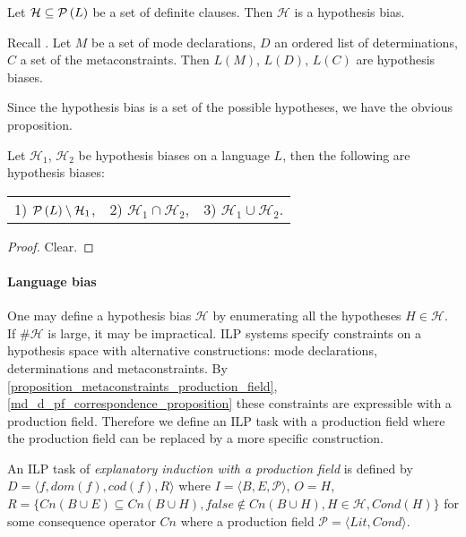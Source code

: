 \begin{exmp}
Let $\mathcal{H} \subseteq \mathcal{P} \left({ L }\right)$ be a set of definite clauses. Then $\mathcal{H}$ is a hypothesis bias.
\end{exmp}

\begin{exmp}
Recall .
Let $M$ be a set of mode declarations, $D$ an ordered list of determinations, $C$ a set of the metaconstraints.
Then $L(M)$, $L(D)$, $L(C)$ are hypothesis biases.
\end{exmp}

Since the hypothesis bias is a set of the possible hypotheses, we have the obvious proposition.
\begin{proposition}
Let $\mathcal{H}_1$, $\mathcal{H}_2$ be hypothesis biases on a language $L$, then the following are hypothesis biases:
\begin{tabular}{ c c c }
1) $\mathcal{P} \left({ L }\right) \setminus \mathcal{H}_1$,&
2) $\mathcal{H}_1 \cap \mathcal{H}_2$,&
3) $\mathcal{H}_1 \cup \mathcal{H}_2$.\\
\end{tabular}
\end{proposition}

\begin{proof}
Clear.
\end{proof}

\paragraph{Language bias}
One may define a hypothesis bias $\mathcal{H}$ by enumerating all the hypotheses $H \in \mathcal{H}$. If $\#\mathcal{H}$ is large, it may be impractical. ILP systems specify constraints on a hypothesis space with alternative constructions:
mode declarations, determinations and metaconstraints.
By \ref{proposition_metaconstraints_production_field}, \ref{md_d_pf_correspondence_proposition} these constraints are expressible with a production field. Therefore we define an ILP task with a production field where the production field can be replaced by a more specific construction.

\begin{defn}
An ILP task of \emph{explanatory induction with a production field} is defined by $D=\langle f, dom(f), cod(f), R \rangle$ where $I=\langle B, E, \mathcal{P}\rangle$, $O=H$,
$R=\{Cn(B \cup E) \subseteq Cn(B \cup H), false \not\in Cn(B \cup H), H \in \mathcal{H}, Cond(H)\}$ for some consequence operator $Cn$ where a production field $\mathcal{P}=\langle Lit, Cond \rangle$.
\end{defn}

